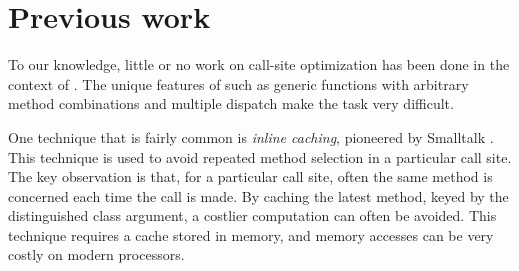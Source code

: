 \section{Previous work}

To our knowledge, little or no work on call-site optimization has been
done in the context of \commonlisp{}.  The unique features of
\commonlisp{} such as generic functions with arbitrary method
combinations and multiple dispatch make the task very difficult.

One technique that is fairly common is \emph{inline caching},
pioneered by Smalltalk \cite{Deutsch:1984:ES}.  This technique is used
to avoid repeated method selection in a particular call site.  The key
observation is that, for a particular call site, often the same method
is concerned each time the call is made.  By caching the latest
method, keyed by the distinguished class argument, a costlier
computation can often be avoided.  This technique requires a cache
stored in memory, and memory accesses can be very costly on modern
processors.
